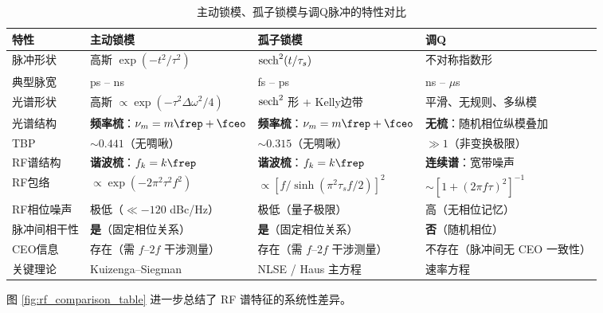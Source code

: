 \documentclass[11pt,a4paper]{article}
\begin{document}
\begin{table}[htbp]
\centering
\caption{主动锁模、孤子锁模与调Q脉冲的特性对比}
\label{tab:comparison}
\renewcommand{\arraystretch}{1.5}
\begin{tabular}{@{}p{2.8cm} p{3.2cm} p{3.2cm} p{3.2cm}@{}}
\toprule
\textbf{特性} & \textbf{主动锁模} & \textbf{孤子锁模} & \textbf{调Q} \\
\midrule
脉冲形状 & 高斯 $\exp(-t^2/\tau^2)$ & $\sech^2(t/\tau_s)$ & 不对称指数形 \\
\hline
典型脉宽 & ps -- ns & fs -- ps & ns -- $\mu$s \\
\hline
光谱形状 & 高斯 $\propto \exp(-\tau^2 \Delta\omega^2/4)$ & $\sech^2$ 形 + Kelly边带 & 平滑、无规则、多纵模 \\
\hline
光谱结构 & \textbf{频率梳}：$\nu_m = m\frep+\fceo$ & \textbf{频率梳}：$\nu_m = m\frep+\fceo$ & \textbf{无梳}：随机相位纵模叠加 \\
\hline
TBP & $\sim 0.441$（无啁啾） & $\sim 0.315$（无啁啾） & $\gg 1$（非变换极限） \\
\hline
RF谱结构 & \textbf{谐波梳}：$f_k = k\frep$ & \textbf{谐波梳}：$f_k = k\frep$ & \textbf{连续谱}：宽带噪声 \\
\hline
RF包络 & $\propto \exp(-2\pi^2\tau^2 f^2)$ & $\propto [f/\sinh(\pi^2\tau_s f/2)]^2$ & $\sim [1+(2\pi f\tau)^2]^{-1}$ \\
\hline
RF相位噪声 & 极低（$\ll -120$ dBc/Hz） & 极低（量子极限） & 高（无相位记忆） \\
\hline
脉冲间相干性 & \textbf{是}（固定相位关系） & \textbf{是}（固定相位关系） & \textbf{否}（随机相位） \\
\hline
CEO信息 & 存在（需 $f$--$2f$ 干涉测量） & 存在（需 $f$--$2f$ 干涉测量） & 不存在（脉冲间无 CEO 一致性） \\
\hline
关键理论 & Kuizenga--Siegman & NLSE / Haus 主方程 & 速率方程 \\
\hline
\end{tabular}
\end{table}

图 \ref{fig:rf_comparison_table} 进一步总结了 RF 谱特征的系统性差异。
\end{document}
